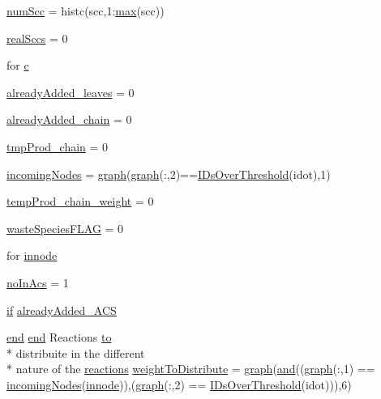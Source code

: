\begin{DoxyCompactItemize}
\item 
\hyperlink{a00028_a0d0db21d4520f7561ff56e2c80e4fb69}{num\-Scc} = histc(scc,1\-:\hyperlink{a00104_a6d9c24e62aee61f54530163edf684ae2}{max}(scc))
\item 
\hyperlink{a00028_a135a83e607075aa815c72f1ec0cbbc5a}{real\-Sccs} = 0
\item 
for \hyperlink{a00028_a0f16b7d4c8c225e06e6a8b2081508e64}{c}
\item 
\hyperlink{a00028_aabbdc56dad7f3314f69a712de710352c}{already\-Added\-\_\-leaves} = 0
\item 
\hyperlink{a00028_a1ddec545d7ccb86836f79e7f7e9ecb55}{already\-Added\-\_\-chain} = 0
\item 
\hyperlink{a00028_a80829d80ab721e79924274808616e45a}{tmp\-Prod\-\_\-chain} = 0
\item 
\hyperlink{a00028_a34c98e3306059653f2a214e5ef975e9c}{incoming\-Nodes} = \hyperlink{a00028_a2745e24fec2a44d51f4452beb1596bd3}{graph}(\hyperlink{a00028_a2745e24fec2a44d51f4452beb1596bd3}{graph}(\-:,2)==\hyperlink{a00028_a67c695f856b6731644c6a128e602a323}{I\-Ds\-Over\-Threshold}(idot),1)
\item 
\hyperlink{a00028_ab9ed4e2836783080230592e6bd20ef86}{temp\-Prod\-\_\-chain\-\_\-weight} = 0
\item 
\hyperlink{a00028_a86a34d23ef767cc82038231f868cea96}{waste\-Species\-F\-L\-A\-G} = 0
\item 
for \hyperlink{a00028_a21f06040cb68a910280e04d4c59d980e}{innode}
\item 
\hyperlink{a00028_ac45b9c97670e4b4e103ce174dc2db6b3}{no\-In\-Acs} = 1
\item 
\hyperlink{a00030_a01d55766b8058903dd360b4bda71f9f5}{if} \hyperlink{a00028_a77c2cda04a3103708011753a77dceda3}{already\-Added\-\_\-\-A\-C\-S}
\item 
\hyperlink{a00025_afb358f48b1646c750fb9da6c6585be2b}{end} \hyperlink{a00025_afb358f48b1646c750fb9da6c6585be2b}{end} Reactions \hyperlink{a00028_af71dbe52628a3f83a77ab494817525c6}{to} \\*
distribuite in the different \\*
nature of the \hyperlink{a00021}{reactions} \hyperlink{a00028_a8f29aae1a516e7b27fa97f490490b59c}{weight\-To\-Distribute} = \hyperlink{a00028_a2745e24fec2a44d51f4452beb1596bd3}{graph}(\hyperlink{a00028_a170f8acb213f91bf71c77b1d20bceb33}{and}((\hyperlink{a00028_a2745e24fec2a44d51f4452beb1596bd3}{graph}(\-:,1) == \hyperlink{a00028_a34c98e3306059653f2a214e5ef975e9c}{incoming\-Nodes}(\hyperlink{a00028_a21f06040cb68a910280e04d4c59d980e}{innode})),(\hyperlink{a00028_a2745e24fec2a44d51f4452beb1596bd3}{graph}(\-:,2) == \hyperlink{a00028_a67c695f856b6731644c6a128e602a323}{I\-Ds\-Over\-Threshold}(idot))),6)

\end{DoxyCompactItemize}
